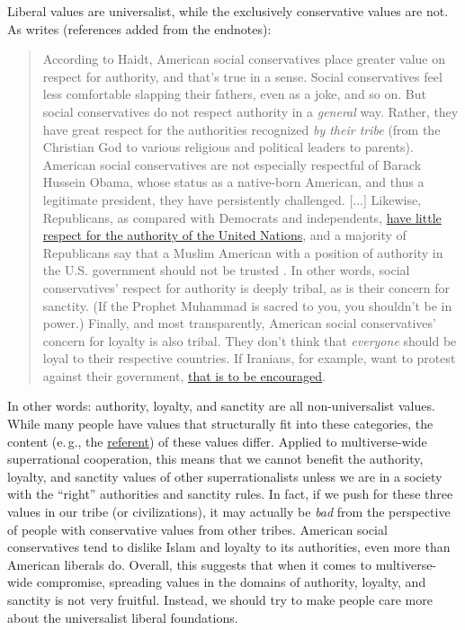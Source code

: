 Liberal values are universalist, while the exclusively conservative
values are not. As \citet[chapter 11, section ``Why I'm a liberal, and what it would take to change my mind'']{Greene2013-sq} writes (references
added from the endnotes):

\begin{quote}
According to Haidt, American social conservatives place greater value on
respect for authority, and that's true in a sense. Social conservatives
feel less comfortable slapping their fathers, even as a joke, and so on.
But social conservatives do not respect authority in a \emph{general}
way. Rather, they have great respect for the authorities recognized
\emph{by their tribe} (from the Christian God to various religious and
political leaders to parents). American social conservatives are not
especially respectful of Barack Hussein Obama, whose status as a
native-born American, and thus a legitimate president, they have
persistently challenged. {[}...{]} Likewise, Republicans, as compared
with Democrats and independents,
\href{http://www.pewglobal.org/2009/09/21/obama-addresses-more-popular-un/}{have
little respect for the authority of the United Nations}, and a majority
of Republicans say that a Muslim American with a position of authority
in the U.S. government should not be trusted
\parencite{analytics2014american}. In other words, social conservatives'
respect for authority is deeply tribal, as is their concern for
sanctity. (If the Prophet Muhammad is sacred to you, you shouldn't be in
power.) Finally, and most transparently, American social conservatives'
concern for loyalty is also tribal. They don't think that
\emph{everyone} should be loyal to their respective countries. If
Iranians, for example, want to protest against their government,
\href{http://www.cbsnews.com/news/gop-hits-obama-for-silence-on-iran-protests/}{that
is to be encouraged}.
\end{quote}

In other words: authority, loyalty, and sanctity are all
non-universalist values. While many people have values that structurally
fit into these categories, the content (e.\,g., the
\href{https://en.wikipedia.org/wiki/Referent}{referent}) of these
values differ. Applied to multiverse-wide superrational cooperation,
this means that we cannot benefit the authority, loyalty, and sanctity
values of other superrationalists unless we are in a society with the
``right'' authorities and sanctity rules. In fact, if we push for these
three values in our tribe (or civilizations), it may actually be
\emph{bad} from the perspective of people with conservative values from
other tribes. American social conservatives tend to dislike Islam and
loyalty to its authorities, even more than American liberals do.
Overall, this suggests that when it comes to multiverse-wide compromise,
spreading values in the domains of authority, loyalty, and sanctity is
not very fruitful. Instead, we should try to make people care more about
the universalist liberal foundations.

